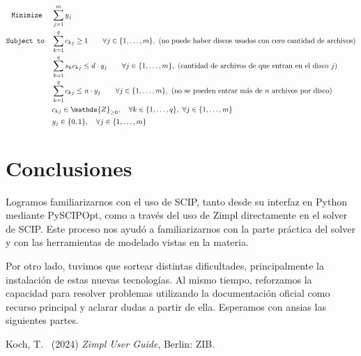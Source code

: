 \documentclass[11pt, a4paper, pdftex]{article}
\begin{document}
\begin{alignat*}{2}
	\minimize
	& \sum_{j = 1}^{m} y_{j}\\
	\subjto
	& \sum_{k = 1}^{q} c_{kj} \ge 1 \qquad \forall j \in \{1, \ldots, m\},\ \text{(no puede haber discos usados con cero cantidad de archivos)}\\
	& \sum_{k = 1}^{q} s_{k} c_{kj} \le d\cdot y_{j} \qquad \forall j \in \{1, \ldots, m\},\ \text{(cantidad de archivos de que entran en el disco $j$)}\\
	& \sum_{k = 1}^{q} c_{kj} \le n\cdot y_{j} \qquad \forall j \in \{1, \ldots, m\},\ \text{(no se pueden entrar más de $n$ archivos por disco)}\\
	& c_{kj} \in \mathds{Z}_{\ge 0}, \quad \forall k \in \{1, \ldots, q\}, \ \forall j \in \{1, \ldots, m\}\\
	& y_{j} \in \{0,1\}, \quad \forall j \in \{1, \ldots, m\}
\end{alignat*}

\section{Conclusiones}

Logramos familiarizarnos con el uso de SCIP, tanto desde su interfaz en
Python mediante PySCIPOpt, como a través del uso de Zimpl directamente
en el solver de SCIP. Este proceso nos ayudó a familiarizarnos con la
parte práctica del solver y con las herramientas de modelado vistas en
la materia.

Por otro lado, tuvimos que sortear distintas dificultades,
principalmente la instalación de estas nuevas tecnologías. Al mismo
tiempo, reforzamos la capacidad para resolver problemas utilizando la
documentación oficial como recurso principal y aclarar dudas a partir de
ella. Esperamos con ansias las siguientes partes.

\begin{thebibliography}{99}
	Koch, T.\
	(2024)
	\emph{Zimpl User Guide},
	Berlin: ZIB.
\end{thebibliography}
\end{document}
